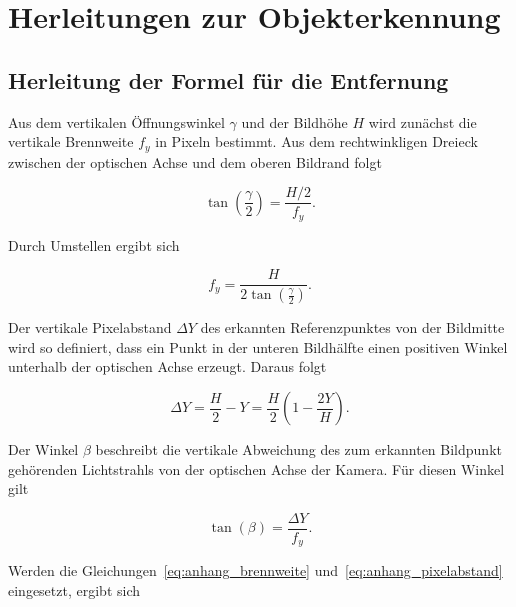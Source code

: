 \appendix

\chapter{Herleitungen zur Objekterkennung} \label{app:herleitungen_objekterkennung} 

\section{Herleitung der Formel für die Entfernung} \label{app:herleitung_entfernung} 

Aus dem vertikalen Öffnungswinkel \(\gamma\) und der Bildhöhe \(H\) wird zunächst die vertikale Brennweite \(f_y\) in Pixeln bestimmt. Aus dem rechtwinkligen Dreieck zwischen der optischen Achse und dem oberen Bildrand folgt 

\begin{equation} 
    \tan\left(\frac{\gamma}{2}\right) = \frac{H/2}{f_y}. 
    \label{eq:anhang_brennweite_ausgang} 
\end{equation} 

Durch Umstellen ergibt sich 

\begin{equation} 
    f_y = \frac{H}{ 2\tan\left(\frac{\gamma}{2}\right) }. 
    \label{eq:anhang_brennweite} 
\end{equation} 

Der vertikale Pixelabstand \(\Delta Y\) des erkannten Referenzpunktes von der Bildmitte wird so definiert, dass ein Punkt in der unteren Bildhälfte einen positiven Winkel unterhalb der optischen Achse erzeugt. Daraus folgt 

\begin{equation} 
    \Delta Y = \frac{H}{2}-Y = \frac{H}{2} \left( 1-\frac{2Y}{H} \right). 
    \label{eq:anhang_pixelabstand} 
\end{equation} 

Der Winkel \(\beta\) beschreibt die vertikale Abweichung des zum erkannten Bildpunkt gehörenden Lichtstrahls von der optischen Achse der Kamera. Für diesen Winkel gilt 

\begin{equation} 
    \tan(\beta) = \frac{\Delta Y}{f_y}. 
    \label{eq:anhang_beta_ausgang} 
\end{equation} 

Werden die Gleichungen~\ref{eq:anhang_brennweite} und~\ref{eq:anhang_pixelabstand} eingesetzt, ergibt sich 

